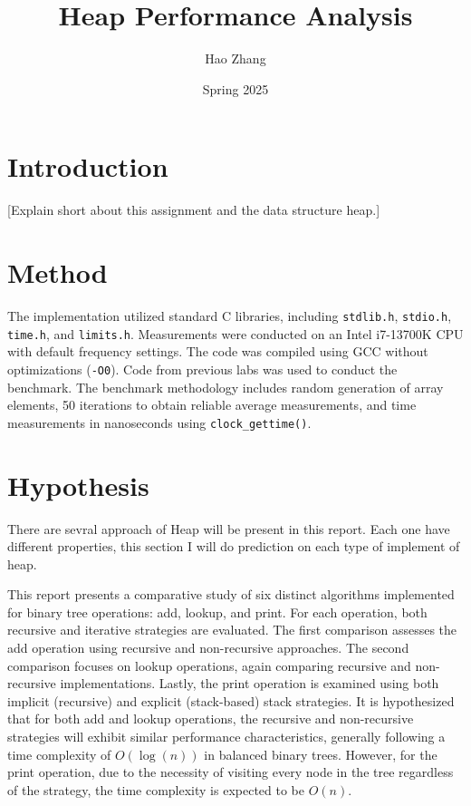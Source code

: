 \documentclass[a4paper,11pt]{article}
\begin{document}
\title{
\textbf{Heap Performance Analysis}
}
\author{Hao Zhang}
\date{Spring 2025}

\maketitle

\section*{Introduction}
[Explain short about this assignment and the data structure heap.]

\section*{Method}
The implementation utilized standard C libraries, including \texttt{stdlib.h}, \texttt{stdio.h}, \texttt{time.h}, and \texttt{limits.h}. Measurements were conducted on an Intel i7-13700K CPU with default frequency settings. The code was compiled using GCC without optimizations (\texttt{-O0}). Code from previous labs was used to conduct the benchmark. The benchmark methodology includes random generation of array elements, 50 iterations to obtain reliable average measurements, and time measurements in nanoseconds using \texttt{clock\_gettime()}.

\section*{Hypothesis}
There are sevral approach of Heap will be present in this report. Each one have different properties, this section I will do prediction on each type of implement of heap.


This report presents a comparative study of six distinct algorithms implemented for binary tree operations: add, lookup, and print. For each operation, both recursive and iterative strategies are evaluated. The first comparison assesses the add operation using recursive and non-recursive approaches. The second comparison focuses on lookup operations, again comparing recursive and non-recursive implementations. Lastly, the print operation is examined using both implicit (recursive) and explicit (stack-based) stack strategies. It is hypothesized that for both add and lookup operations, the recursive and non-recursive strategies will exhibit similar performance characteristics, generally following a time complexity of $O(\log(n))$ in balanced binary trees. However, for the print operation, due to the necessity of visiting every node in the tree regardless of the strategy, the time complexity is expected to be $O(n)$.
\end{document}
